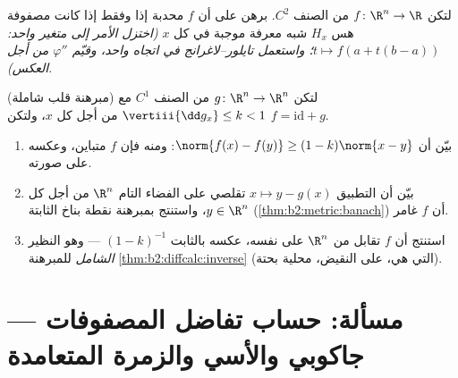 \begin{exercise}[$\star\star$]\label{exo:b2:diffcalc:11}
لتكن $f \colon \R^n \to \R$ من الصنف $C^2$. برهن على أن $f$ محدبة إذا وفقط إذا
كانت مصفوفة هس $H_x$ شبه معرفة موجبة في كل $x$
\emph{(اختزل الأمر إلى متغير واحد: $t \mapsto f(a + t(b-a))$؛ واستعمل تايلور--لاغرانج
في اتجاه واحد، وقيّم $\varphi''$ من أجل العكس)}.
\end{exercise}

\begin{exercise}[$\star\star\star$]\label{exo:b2:diffcalc:12}
(مبرهنة قلب شاملة) لتكن $g \colon \R^n \to \R^n$ من الصنف $C^1$
مع $\vertiii{\dd g_x} \leq k < 1$ من أجل كل $x$، ولتكن $f =
\mathrm{id} + g$.
\begin{enumerate}
  \item بيّن أن $\norm{f(x) - f(y)} \geq (1 - k)\norm{x - y}$: ومنه فإن $f$ متباين، وعكسه  على صورته.
  \item بيّن أن التطبيق $x \mapsto y -
        g(x)$ تقلصي على الفضاء التام $\R^n$ من أجل
        كل $y \in \R^n$، واستنتج بمبرهنة نقطة بناخ الثابتة
        (\cref{thm:b2:metric:banach}) أن $f$ غامر.
  \item استنتج أن $f$ تقابل من $\R^n$ على نفسه، عكسه 
        بالثابت $(1-k)^{-1}$ --- وهو النظير \emph{الشامل} للمبرهنة
        \cref{thm:b2:diffcalc:inverse} (التي هي، على النقيض، محلية بحتة).
\end{enumerate}
\end{exercise}

\section{مسألة: حساب تفاضل المصفوفات --- جاكوبي والأسي والزمرة
المتعامدة}

